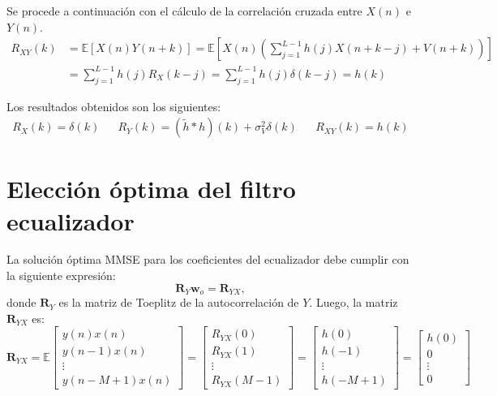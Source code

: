 Se procede a continuación con el cálculo de la correlación cruzada entre $X(n)$ e $Y(n)$.
\begin{align*}
    R_{XY}(k) &= \mathbb{E}[X(n)Y(n+k)] = \mathbb{E}\left[X(n)\left(\sum_{j=1}^{L-1} h(j)X(n + k - j) + V(n+k)\right)\right]\\
    &= \sum_{j=1}^{L-1} h(j) R_X(k-j) = \sum_{j=1}^{L-1} h(j) \delta(k-j) = h(k)
\end{align*}

Los resultados obtenidos son los siguientes:
\begin{align*}
    \boxed{R_X(k) = \delta(k)} &&
    \boxed{R_Y(k) = (\tilde{h} * h)(k) + \sigma_V^2 \delta(k)} &&
    \boxed{R_{XY}(k) = h(k)}
\end{align*}

\section{Elección óptima del filtro ecualizador}
\label{sec:eleccion-optima}

La solución óptima MMSE para los coeficientes del ecualizador debe cumplir con la siguiente expresión:
\begin{equation*}
	\mathbf{R}_Y \mathbf{w}_o = \mathbf{R}_{YX},
\end{equation*}
donde $\mathbf{R}_Y$ es la matriz de Toeplitz de la autocorrelación de $Y$. Luego, la matriz $\mathbf{R}_{YX}$ es:
\[
\mathbf{R}_{YX} = \mathbb{E}
\begin{bmatrix}
	y(n) x(n) \\
	y(n-1) x(n) \\
	\vdots \\
	y(n - M + 1) x(n)
\end{bmatrix}
=
\begin{bmatrix}
	R_{YX}(0) \\
	R_{YX}(1) \\
	\vdots \\
	R_{YX}(M-1)
\end{bmatrix}
=
\begin{bmatrix}
	h(0) \\
	h(-1) \\
	\vdots \\
	h(-M+1)
\end{bmatrix}
=
\begin{bmatrix}
	h(0) \\
	0 \\
	\vdots \\
	0
\end{bmatrix}
\]

